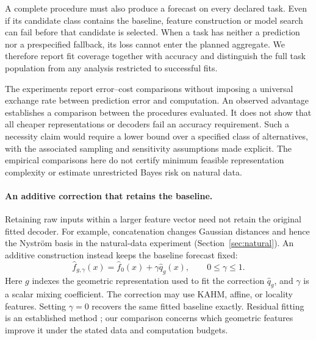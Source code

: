 A complete procedure must also produce a forecast on every declared task.
Even if its candidate class contains the baseline, feature construction or
model search can fail before that candidate is selected. When a task has
neither a prediction nor a prespecified fallback, its loss cannot enter the
planned aggregate. We therefore report fit coverage together with accuracy
and distinguish the full task population from any analysis restricted to
successful fits.

The experiments report error--cost comparisons without imposing a universal
exchange rate between prediction error and computation. An observed
advantage establishes a comparison between the procedures evaluated. It
does not show that all cheaper representations or decoders fail an accuracy
requirement. Such a necessity claim would require a lower bound over a
specified class of alternatives, with the associated sampling and
sensitivity assumptions made explicit.
The empirical comparisons here do not certify minimum feasible
representation complexity or estimate unrestricted Bayes risk on natural
data.

\paragraph{An additive correction that retains the baseline.}
Retaining raw inputs within a larger feature vector need not retain the
original fitted decoder. For example, concatenation changes Gaussian
distances and hence the Nystr\"om basis in the natural-data experiment
(Section~\ref{sec:natural}). An additive construction instead keeps the
baseline forecast fixed:
\begin{equation}\label{eq:utility-additive}
 \widehat f_{g,\gamma}(x)
 =\widehat f_0(x)+\gamma\widehat q_g(x),\qquad 0\leq\gamma\leq1.
\end{equation}
Here $g$ indexes the geometric representation used to fit the correction
$\widehat q_g$, and $\gamma$ is a scalar mixing coefficient. The correction
may use KAHM, affine, or locality features. Setting $\gamma=0$ recovers the
same fitted baseline exactly. Residual fitting is an established method
\citep{Buhlmann2003L2}; our comparison concerns which geometric features
improve it under the stated data and computation budgets.

